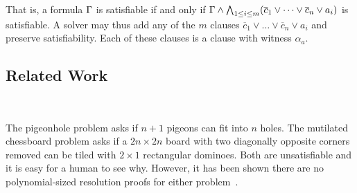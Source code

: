 That is, a formula $\Gamma$ is satisfiable if and only if $\Gamma \land
\bigwedge_{1 \leq i \leq m} (\overline{c}_1 \lor \dots \lor \overline{c}_n \lor
a_i)$ is satisfiable. A solver may thus add any of the $m$ clauses
$\overline{c}_1 \lor \dots \lor \overline{c}_n \lor a_i$ and preserve
satisfiability. Each of these clauses is a \pr clause with witness $\alpha_a$.



   




\subsection{Related Work}~\label{subsec:relatedwork}

The pigeonhole problem asks if $n+1$ pigeons can fit into $n$ holes. The
mutilated chessboard problem asks if a $2n \times 2n$ board with two diagonally
opposite corners removed can be tiled with $2 \times 1$ rectangular dominoes.
Both are unsatisfiable and it is easy for a human to see why. However, it has
been shown there are no polynomial-sized resolution proofs for either
problem~\cite{hakenpigeonhole,mutilatedchessboard-exponential}.


